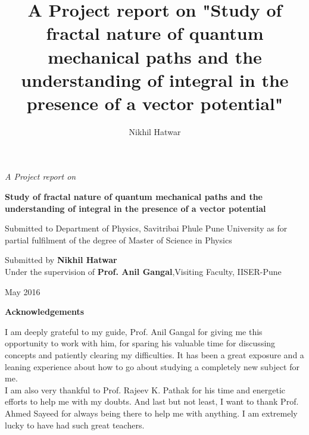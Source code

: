 \documentclass[14pt]{extarticle}
\title{A Project report on "Study of fractal nature of quantum mechanical paths and the understanding of integral in the presence of a vector potential"}
\author{Nikhil Hatwar}
\begin{document}
\begin{center}

\bigskip\bigskip\bigskip\bigskip\bigskip\bigskip
\bigskip\bigskip\bigskip\bigskip\bigskip\bigskip
\begin{LARGE}
\textit{A Project report on} \\
\bigskip\bigskip\bigskip\bigskip

\textbf{Study of fractal nature of quantum mechanical paths and the understanding of integral in the presence of a vector potential}
\end{LARGE}

\bigskip\bigskip\bigskip\bigskip
\bigskip\bigskip\bigskip\bigskip

Submitted to Department of Physics, Savitribai Phule Pune University as for partial fulfilment of the degree of Master of Science in Physics


\bigskip\bigskip\bigskip\bigskip
\bigskip\bigskip\bigskip\bigskip

Submitted by \textbf{Nikhil Hatwar}\\
Under the supervision of \textbf{Prof. Anil Gangal},Visiting Faculty, IISER-Pune

\bigskip\bigskip\bigskip\bigskip
\bigskip\bigskip\bigskip\bigskip
\bigskip\bigskip\bigskip\bigskip
\bigskip\bigskip\bigskip\bigskip


\begin{LARGE}
May 2016
\end{LARGE}
\end{center}


\newpage

\begin{center}
\begin{LARGE}
\textbf{Acknowledgements}
\end{LARGE}
\end{center}


I am deeply grateful to my guide, Prof. Anil Gangal for giving me this opportunity to work with him, for sparing his valuable time for discussing concepts and patiently clearing my difficulties. It has been a great exposure and a leaning experience about how to go about studying a completely new subject for me.
\\

 I am also very thankful to Prof. Rajeev K. Pathak for his time and energetic efforts to help me with my doubts. And last but not least, I want to thank Prof. Ahmed Sayeed for always being there to help me with anything. I am extremely lucky to have had such great teachers.
\end{document}
